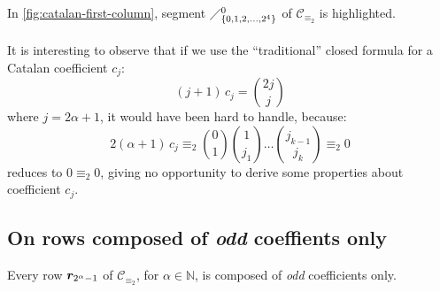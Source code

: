 In \autoref{fig:catalan-first-column}, segment
$\diagup_{\lbrace 0,1,2,\ldots,2^{4}\rbrace}^{0}$ of $\mathcal{C}_{\equiv_{2}}$
is highlighted.
\\\\
It is interesting to observe that if we use the ``traditional'' closed formula
for a Catalan coefficient $c_{j}$:
\begin{displaymath}
    (j+1)\,c_{j} = {{2j}\choose{j}} 
\end{displaymath}
where $j=2\alpha+1$, it would have been hard to handle, because:
\begin{displaymath}
    2(\alpha+1)\,c_{j}\equiv_{2} {{0}\choose{1}}{{1}\choose{j_{1}}}
            \ldots{{j_{k-1}}\choose{j_{k}}} \equiv_{2} 0
\end{displaymath}
reduces to $0\equiv_{2}0$, giving no opportunity to derive some
properties about coefficient $c_{j}$.



\subsection{On rows composed of \emph{odd} coeffients only}

\begin{theorem}
    Every row $\boldsymbol{r}_{2^{\alpha}-1}$ of $\mathcal{C}_{\equiv_{2}}$, 
    for $\alpha\in\mathbb{N}$, is composed of \emph{odd} coefficients only.
\end{theorem}

